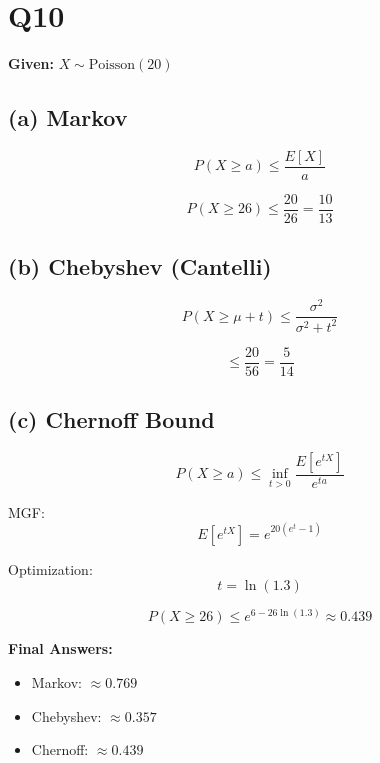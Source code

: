 \documentclass[12pt]{article}
\begin{document}
\section*{Q10}

\textbf{Given:} $X \sim \text{Poisson}(20)$

\subsection*{(a) Markov}

\[
P(X \ge a) \le \frac{E[X]}{a}
\]

\[
P(X \ge 26) \le \frac{20}{26} = \frac{10}{13}
\]

\subsection*{(b) Chebyshev (Cantelli)}

\[
P(X \ge \mu + t) \le \frac{\sigma^2}{\sigma^2 + t^2}
\]

\[
\le \frac{20}{56} = \frac{5}{14}
\]

\subsection*{(c) Chernoff Bound}

\[
P(X \ge a) \le \inf_{t>0} \frac{E[e^{tX}]}{e^{ta}}
\]

MGF:
\[
E[e^{tX}] = e^{20(e^t - 1)}
\]

Optimization:
\[
t = \ln(1.3)
\]

\[
P(X \ge 26) \le e^{6 - 26\ln(1.3)} \approx 0.439
\]

\textbf{Final Answers:}
\begin{itemize}
\item Markov: $\approx 0.769$
\item Chebyshev: $\approx 0.357$
\item Chernoff: $\approx 0.439$
\end{itemize}
\end{document}
